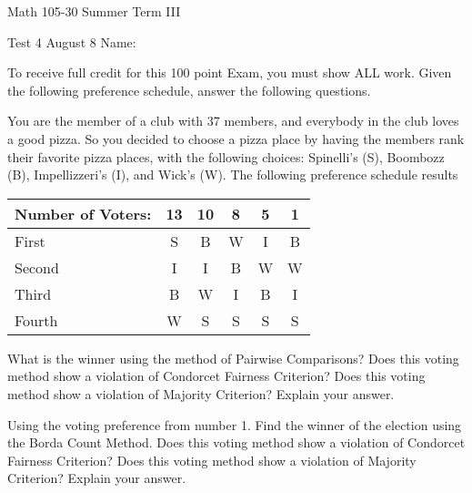 \documentclass[11pt,epsfig]{article}
\begin{document}
Math 105-30 Summer Term III 

Test 4 August 8 \hspace{1.9in} {Name:} {\underline {\hspace{3.5in}}}
\vspace{2pc}

To receive full credit for this 100 point Exam, you must show ALL work. Given the following preference schedule, answer the following questions.
\vspace{0.5pc}

   
\begin{problem}{15}
You are the member of a club with 37 members, and everybody in the club loves a good pizza. So you decided to choose a pizza place by having the members rank their favorite pizza places, with the following choices: Spinelli’s (S), Boombozz (B), Impellizzeri’s (I), and Wick’s (W). The following preference schedule results


 \begin{center}
 \begin{tabular}{ | l | c | c  |  c |  c | c |}
   \hline
   Number of Voters: & 13 & 10 & 8 & 5 & 1\\ \hline
   First & S & B & W & I & B \\ \hline
   Second & I & I & B & W & W \\ \hline
   Third & B & W & I & B & I \\ \hline
   Fourth & W & S & S & S & S \\ \hline
   \end{tabular}
  \end{center}
What is the winner using the method of Pairwise Comparisons? Does this voting method show a violation of Condorcet Fairness Criterion? Does this voting method show a violation of Majority Criterion? Explain your answer. 


\vfill
\end{problem}


\begin{problem}{15}
Using the voting preference from number 1. Find the winner of the election using the Borda Count Method. Does this voting method show a violation of Condorcet Fairness Criterion? Does this voting method show a violation of Majority Criterion? Explain your answer.
\vfill
\end{problem}
\end{document}
